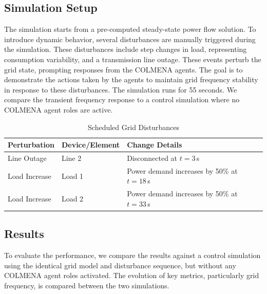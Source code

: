\documentclass{article}
\begin{document}
\subsection{Simulation Setup}

The simulation starts from a pre-computed steady-state power flow solution. To introduce dynamic behavior, several disturbances are manually triggered during the simulation. These disturbances include step changes in load, representing consumption variability, and a transmission line outage. These events perturb the grid state, prompting responses from the COLMENA agents. The goal is to demonstrate the actions taken by the agents to maintain grid frequency stability in response to these disturbances. The simulation runs for 55 seconds. We compare the transient frequency response to a control simulation where no COLMENA agent roles are active.

\begin{table}[h]
    \centering
    \begin{tabular}{|l|l|l|}
    \hline
    \textbf{Perturbation} & \textbf{Device/Element} & \textbf{Change Details} \\
    \hline
    Line Outage & Line 2 & Disconnected at $t = 3\,$s \\
    Load Increase & Load 1 & Power demand increases by 50\% at $t = 18\,$s \\
    Load Increase & Load 2 & Power demand increases by 50\% at $t = 33\,$s \\
    \hline
    \end{tabular}
    \caption{Scheduled Grid Disturbances}
    \label{tab:disturbances}
\end{table}

\subsection{Results}

To evaluate the performance, we compare the results against a control simulation using the identical grid model and disturbance sequence, but without any COLMENA agent roles activated. The evolution of key metrics, particularly grid frequency, is compared between the two simulations.
\end{document}
